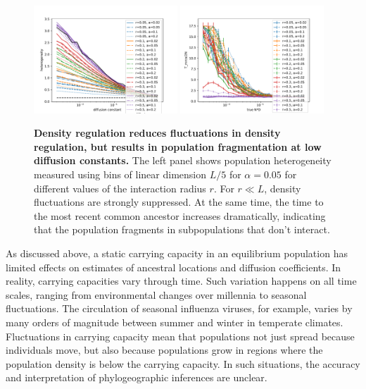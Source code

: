 \documentclass[aps,rmp, twocolumn]{revtex4}
\begin{document}
\begin{figure}
    \includegraphics[width=0.48\textwidth]{figures/density_reg_heterogeneity.pdf}
    \includegraphics[width=0.48\textwidth]{figures/density_reg_tmrca.pdf}
    \caption{\label{fig:density_reg} {\bf Density regulation reduces fluctuations in density regulation, but results in population fragmentation at low diffusion constants.} The left panel shows population heterogeneity measured using bins of linear dimension $L/5$ for $\alpha =0.05$ for different values of the interaction radius $r$. For $r\ll L$, density fluctuations are strongly suppressed. At the same time, the time to the most recent common ancestor increases dramatically, indicating that the population fragments in subpopulations that don't interact.}
\end{figure}

As discussed above, a static carrying capacity in an equilibrium population has limited effects on estimates of ancestral locations and diffusion coefficients. 
In reality, carrying capacities vary through time. 
Such variation happens on all time scales, ranging from environmental changes over millennia to seasonal fluctuations. 
The circulation of seasonal influenza viruses, for example, varies by many orders of magnitude between summer and winter in temperate climates.
Fluctuations in carrying capacity mean that populations not just spread because individuals move, but also because populations grow in regions where the population density is below the carrying capacity.
In such situations, the accuracy and interpretation of phylogeographic inferences are unclear. 
\end{document}
